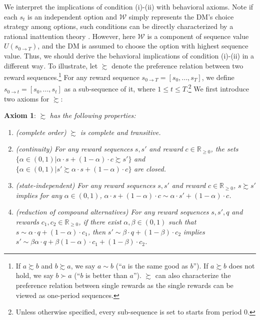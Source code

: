 \documentclass[
  12pt,
]{article}
\begin{document}
We interpret the implications of condition (i)-(ii) with behavioral
axioms. Note if each \(s_t\) is an independent option and
\(\mathcal{W}\) simply represents the DM's choice strategy among
options, such conditions can be directly characterized by a rational
inattention theory \citep[e.g.][]{caplin2022rationally}. However, here
\(\mathcal{W}\) is a component of sequence value
\(U(s_{0\rightarrow T})\), and the DM is assumed to choose the option
with highest sequence value. Thus, we should derive the behavioral
implications of condition (i)-(ii) in a different way\emph{.} To
illustrate, let \(\succsim\) denote the preference relation between two
reward sequences.\footnote{If \(a \succsim b\) and \(b\succsim a\), we
  say \(a\sim b\) (``\(a\) is the same good as \(b\)''). If
  \(a \succsim b\) does not hold, we say \(b\succ a\) (``\(b\) is better
  than \(a\)''). \(\succsim\) can also characterize the preference
  relation between single rewards as the single rewards can be viewed as
  one-period sequences.} For any reward sequence
\(s_{0\rightarrow T}=[s_0,...,s_T]\), we define
\(s_{0\rightarrow t}=[s_0,...,s_t]\) as a sub-sequence of it, where
\(1\leq t\leq T\).\footnote{Unless otherwise specified, every
  sub-sequence is set to starts from period 0.} We first introduce two
axioms for \(\succsim\):

\noindent \textbf{Axiom 1}: \(\succsim\) \emph{has the following
properties:}

\begin{enumerate}
\def\labelenumi{(\alph{enumi})}
\item
  \emph{(complete order)} \(\succsim\) \emph{is complete and
  transitive.}
\item
  \emph{(continuity) For any reward sequences} \(s,s'\) \emph{and
  reward} \(c\in \mathbb{R}_{\geq 0}\)\emph{, the sets}
  \(\{\alpha \in(0,1) | \alpha\cdot s + (1-\alpha)\cdot c \succsim s'\}\)
  \emph{and}
  \(\{\alpha \in(0,1) | s' \succsim \alpha\cdot s + (1-\alpha)\cdot c \}\)
  \emph{are closed.}
\item
  \emph{(state-independent) For any reward sequences} \(s,s'\) \emph{and
  reward} \(c\in \mathbb{R}_{\geq 0}\)\emph{,} \(s \succsim s'\)
  \emph{implies for any} \(\alpha \in (0,1)\)\emph{,}
  \(\alpha\cdot s + (1-\alpha)\cdot c \sim \alpha \cdot s' + (1-\alpha) \cdot c\)\emph{.}
\item
  \emph{(reduction of compound alternatives) For any reward sequences}
  \(s,s',q\) \emph{and rewards}
  \(c_1,c_2\in \mathbb{R}_{\geq 0}\)\emph{, if there exist}
  \(\alpha, \beta \in (0,1)\) \emph{such that}
  \(s \sim \alpha \cdot q + (1-\alpha) \cdot c_1\)\emph{, then}
  \(s' \sim \beta \cdot q + (1-\beta)\cdot c_2\) \emph{implies}
  \(s' \sim \beta\alpha\cdot q+\beta(1-\alpha)\cdot c_1 + (1-\beta)\cdot c_2\)\emph{.}
\end{enumerate}
\end{document}
